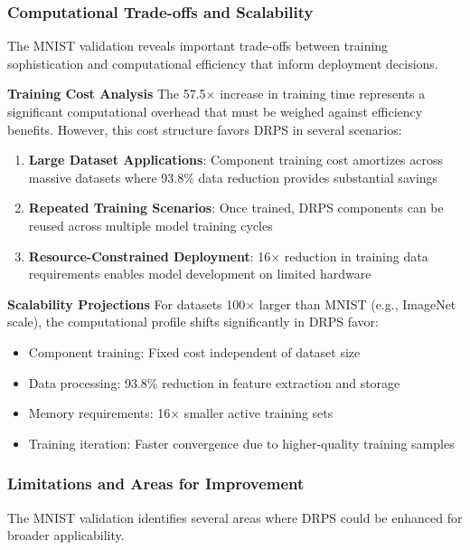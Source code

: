 \documentclass[12pt]{article}
\begin{document}
\subsubsection{Computational Trade-offs and Scalability}\label{scalability-analysis}

The MNIST validation reveals important trade-offs between training sophistication and computational efficiency that inform deployment decisions.

\textbf{Training Cost Analysis}
The 57.5× increase in training time represents a significant computational overhead that must be weighed against efficiency benefits. However, this cost structure favors DRPS in several scenarios:

\begin{enumerate}
\item \textbf{Large Dataset Applications}: Component training cost amortizes across massive datasets where 93.8\% data reduction provides substantial savings
\item \textbf{Repeated Training Scenarios}: Once trained, DRPS components can be reused across multiple model training cycles
\item \textbf{Resource-Constrained Deployment}: 16× reduction in training data requirements enables model development on limited hardware
\end{enumerate}

\textbf{Scalability Projections}
For datasets 100× larger than MNIST (e.g., ImageNet scale), the computational profile shifts significantly in DRPS favor:
\begin{itemize}
\item Component training: Fixed cost independent of dataset size
\item Data processing: 93.8\% reduction in feature extraction and storage
\item Memory requirements: 16× smaller active training sets
\item Training iteration: Faster convergence due to higher-quality training samples
\end{itemize}

\subsubsection{Limitations and Areas for Improvement}\label{limitations}

The MNIST validation identifies several areas where DRPS could be enhanced for broader applicability.
\end{document}
